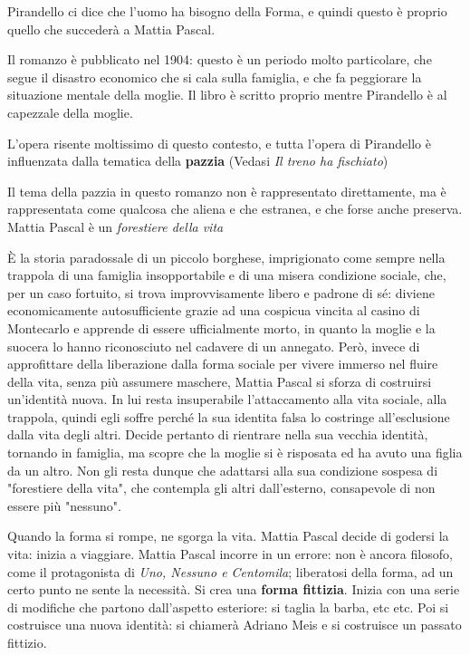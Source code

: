 Pirandello ci dice che l'uomo ha bisogno della Forma, e quindi questo è proprio quello che succederà a Mattia Pascal.

Il romanzo è pubblicato nel 1904: questo è un periodo molto particolare, che segue il disastro economico che si cala sulla famiglia, e che fa peggiorare la situazione mentale della moglie.
Il libro è scritto proprio mentre Pirandello è al capezzale della moglie.

L'opera risente moltissimo di questo contesto, e tutta l'opera di Pirandello è influenzata dalla tematica della \textbf{pazzia} (Vedasi \textit{Il treno ha fischiato})

Il tema della pazzia in questo romanzo non è rappresentato direttamente, ma è rappresentata come qualcosa che aliena e che estranea, e che forse anche preserva.
Mattia Pascal è un \emph{forestiere della vita}

È la storia paradossale di un piccolo borghese, imprigionato come sempre nella trappola di una famiglia insopportabile e di una misera condizione sociale, che, per un caso fortuito, si trova improvvisamente libero e padrone di sé: diviene economicamente autosufficiente grazie ad una cospicua vincita al casino di Montecarlo e apprende di essere ufficialmente morto, in quanto la moglie e la suocera lo hanno riconosciuto nel cadavere di un annegato. Però, invece di approfittare della liberazione dalla forma sociale per vivere immerso nel fluire della vita, senza più assumere maschere, Mattia Pascal si sforza di costruirsi un'identità nuova. In lui resta insuperabile l'attaccamento alla vita sociale, alla trappola, quindi egli soffre perché la sua identita falsa lo costringe all'esclusione dalla vita degli altri. Decide pertanto di rientrare nella sua vecchia identità, tornando in famiglia, ma scopre che la moglie si è risposata ed ha avuto una figlia da un altro. Non gli resta dunque che adattarsi alla sua condizione sospesa di "forestiere della vita", che contempla gli altri dall'esterno, consapevole di non essere più "nessuno".

Quando la forma si rompe, ne sgorga la vita. Mattia Pascal decide di godersi la vita: inizia a viaggiare.
Mattia Pascal incorre in un errore: non è ancora filosofo, come il protagonista di \textit{Uno, Nessuno e Centomila}; liberatosi della forma, ad un certo punto ne sente la necessità. Si crea una \textbf{forma fittizia}.
Inizia con una serie di modifiche che partono dall'aspetto esteriore: si taglia la barba, etc etc.
Poi si costruisce una nuova identità: si chiamerà Adriano Meis e si costruisce un passato fittizio.

